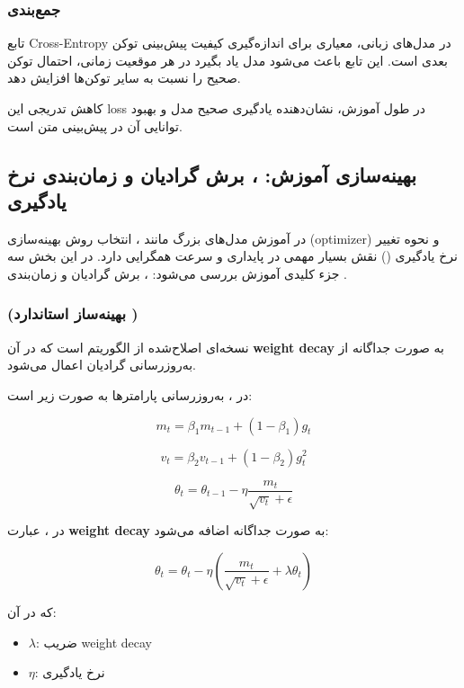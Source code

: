 \documentclass{article}
\begin{document}
\subsubsection*{جمع‌بندی}

تابع Cross-Entropy در مدل‌های زبانی، معیاری برای اندازه‌گیری کیفیت پیش‌بینی توکن بعدی است. این تابع باعث می‌شود مدل یاد بگیرد در هر موقعیت زمانی، احتمال توکن صحیح را نسبت به سایر توکن‌ها افزایش دهد.

کاهش تدریجی این loss در طول آموزش، نشان‌دهنده یادگیری صحیح مدل و بهبود توانایی آن در پیش‌بینی متن است.


\subsection{بهینه‌سازی آموزش: ، برش گرادیان و زمان‌بندی نرخ یادگیری}

در آموزش مدل‌های بزرگ مانند ، انتخاب روش بهینه‌سازی (optimizer) و نحوه تغییر نرخ یادگیری () نقش بسیار مهمی در پایداری و سرعت همگرایی دارد. در این بخش سه جزء کلیدی آموزش بررسی می‌شود: ، برش گرادیان و زمان‌بندی .

\subsubsection*{ (بهینه‌ساز استاندارد )}

 نسخه‌ای اصلاح‌شده از الگوریتم  است که در آن \textbf{weight decay} به صورت جداگانه از به‌روزرسانی گرادیان اعمال می‌شود.

در ، به‌روزرسانی پارامترها به صورت زیر است:

\[
m_t = \beta_1 m_{t-1} + (1 - \beta_1) g_t
\]

\[
v_t = \beta_2 v_{t-1} + (1 - \beta_2) g_t^2
\]

\[
\theta_t = \theta_{t-1} - \eta \frac{m_t}{\sqrt{v_t} + \epsilon}
\]

در ، عبارت \textbf{weight decay} به صورت جداگانه اضافه می‌شود:

\[
\theta_t = \theta_t - \eta \left( \frac{m_t}{\sqrt{v_t} + \epsilon} + \lambda \theta_t \right)
\]

که در آن:

\begin{itemize}
	\item \( \lambda \): ضریب weight decay
	\item \( \eta \): نرخ یادگیری
\end{itemize}
\end{document}
